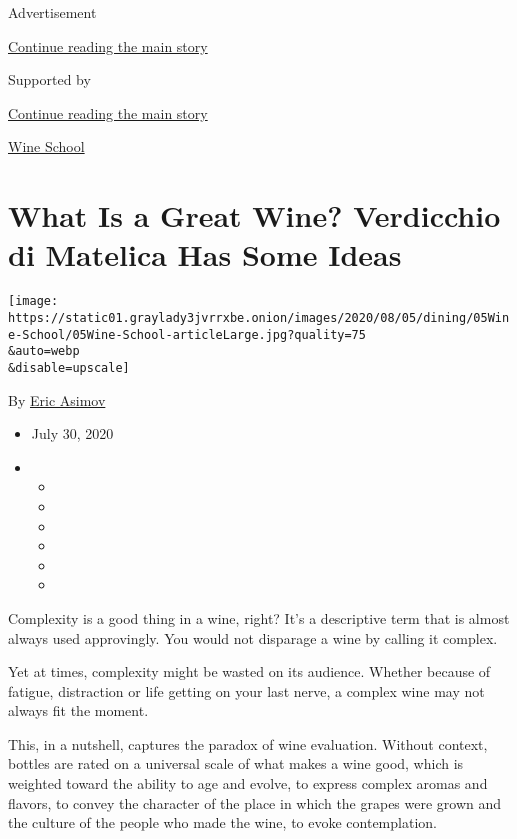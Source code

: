 Advertisement

\protect\hyperlink{after-top}{Continue reading the main story}

Supported by

\protect\hyperlink{after-sponsor}{Continue reading the main story}

\href{/column/wine-school}{Wine School}

\hypertarget{what-is-a-great-wine-verdicchio-di-matelica-has-some-ideas}{%
\section{What Is a Great Wine? Verdicchio di Matelica Has Some
Ideas}\label{what-is-a-great-wine-verdicchio-di-matelica-has-some-ideas}}

\texttt{[image: https://static01.graylady3jvrrxbe.onion/images/2020/08/05/dining/05Wine-School/05Wine-School-articleLarge.jpg?quality=75\\\&auto=webp\\\&disable=upscale]}

By \href{https://www.nytimes3xbfgragh.onion/by/eric-asimov}{Eric Asimov}

\begin{itemize}
\item
  July 30, 2020
\item
  \begin{itemize}
  \item
  \item
  \item
  \item
  \item
  \item
  \end{itemize}
\end{itemize}

Complexity is a good thing in a wine, right? It's a descriptive term
that is almost always used approvingly. You would not disparage a wine
by calling it complex.

Yet at times, complexity might be wasted on its audience. Whether
because of fatigue, distraction or life getting on your last nerve, a
complex wine may not always fit the moment.

This, in a nutshell, captures the paradox of wine evaluation. Without
context, bottles are rated on a universal scale of what makes a wine
good, which is weighted toward the ability to age and evolve, to express
complex aromas and flavors, to convey the character of the place in
which the grapes were grown and the culture of the people who made the
wine, to evoke contemplation.

